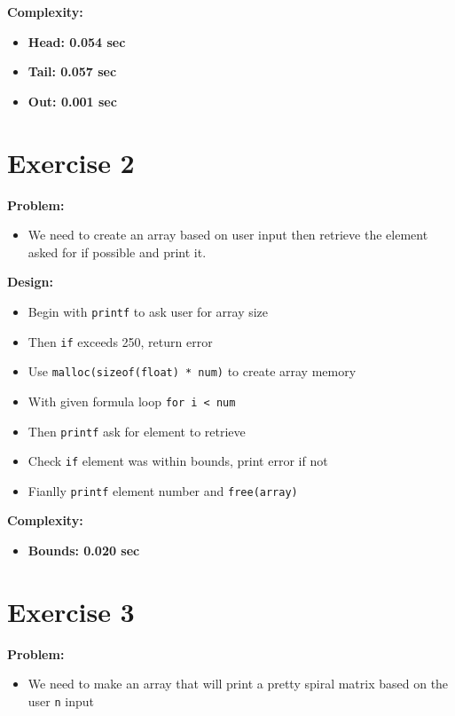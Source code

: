 \documentclass{article}
\begin{document}
\textbf{Complexity:}
\begin{itemize}
\item{\textbf{Head: 0.054 sec}}
\item{\textbf{Tail: 0.057 sec}}
\item{\textbf{Out: 0.001 sec}}
\end{itemize}



\newpage

\section{Exercise 2}

\textbf{Problem:}
\begin{itemize}
\item{We need to create an array based on user input then retrieve the element asked for if possible and print it.}
\end{itemize}

\textbf{Design:}
\begin{itemize}
\item{Begin with \texttt{printf} to ask user for array size}
\item{Then \texttt{if} exceeds 250, return error}
\item{Use \texttt{malloc(sizeof(float) * num)} to create array memory}
\item{With given formula loop \texttt{for i < num}}
\item{Then \texttt{printf} ask for element to retrieve}
\item{Check \texttt{if} element was within bounds, print error if not}
\item{Fianlly \texttt{printf} element number and \texttt{free(array)}}
\end{itemize}

\textbf{Complexity:}
\begin{itemize}
\item{\textbf{Bounds: 0.020 sec}}
\end{itemize}



\newpage

\section{Exercise 3}

\textbf{Problem:}
\begin{itemize}
\item{We need to make an array that will print a pretty spiral matrix based on the user \texttt{n} input }
\end{itemize}
\end{document}
